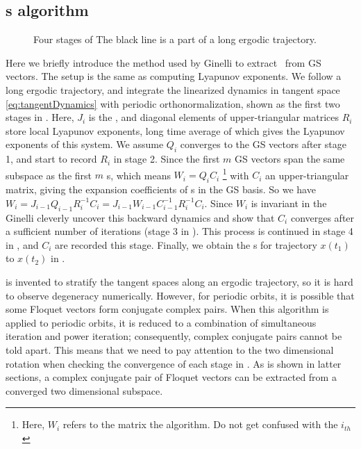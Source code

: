 \documentclass[final,leqno,onefignum,onetabnum]{siamltexmm}
\begin{document}
\subsection{\CLv s algorithm}
\label{subsec:clvs}
\begin{figure}
  \centering
  
  \caption{Four stages of 
    The black line is a part of
    a long ergodic trajectory.}
  \label{fig:CLV}
\end{figure}
Here we briefly introduce the method used by
Ginelli 
to extract
\cLvs\ from GS vectors. The setup is the same as computing Lyapunov
exponents. We follow a long ergodic trajectory, and integrate
the linearized dynamics in tangent space \eqref{eq:tangentDynamics}
with periodic orthonormalization, shown as the first two stages in
.
Here, $J_i$ is the , and diagonal elements
of upper-triangular
matrices $R_i$ store local
Lyapunov exponents, long time average of which gives the Lyapunov
exponents of this system. We assume $Q_i$ converges to the GS vectors after
stage 1, and start to record $R_i$ in
stage 2. Since the first $m$ GS vectors span the same subspace as the
first $m$ \cLv s, which means
$W_i = Q_i C_i$ \footnote{Here, $W_i$ refers to the matrix
 the algorithm. Do not get confused with the
$i_{th}$ 
}
with $C_i$ an upper-triangular matrix, giving the expansion
coefficients of \cLv s in the GS basis.
So we have
$W_i = J_{i-1} Q_{i-1} R^{-1}_{i}C_i = J_{i-1}W_{i-1}C_{i-1}^{-1}R^{-1}_{i} C_i$.
Since $W_i$ is invariant in the 
Ginelli   cleverly uncover
this backward dynamics and show that $C_i$ converges after a sufficient
number of iterations (stage 3 in ). This process
is continued in stage 4 in , and $C_i$ are recorded
 this stage. Finally, we obtain the \cLv s for trajectory $x(t_1)$
to $x(t_2)$ in .

 is invented to stratify the tangent spaces along
an ergodic trajectory, so it is hard to observe
degeneracy numerically. However, for periodic orbits, it is
possible that some Floquet vectors form conjugate complex pairs.
When this algorithm is applied to periodic orbits, it is reduced
to a combination of simultaneous iteration and 
power iteration;
consequently, complex conjugate pairs cannot be told apart.
This
means that we need to pay attention to the two dimensional rotation
when checking the convergence of each stage in .
As is shown in latter sections, a complex conjugate pair
of Floquet vectors can be extracted from a converged two
dimensional subspace.
\end{document}
